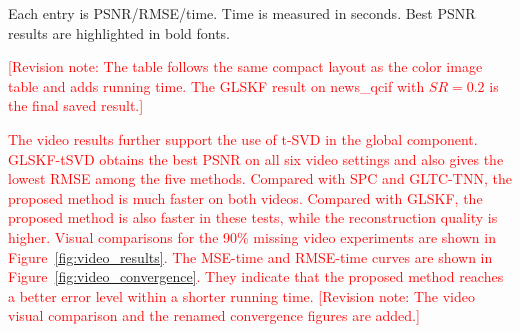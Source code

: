 \documentclass[a4paper,12pt]{article}
\numberwithin{equation}{section}
\numberwithin{algorithm}{section}
\newcommand{\rev}[1]{\textcolor{red}{#1}}
\newcommand{\revnote}[1]{\textcolor{red}{[Revision note: #1]}}
\theoremstyle{remark}
\theoremstyle{definition}
\begin{document}
\begin{table}[!htbp]
	\centering
	\color{red}
                                               	\caption{\textbf{Comparison of video completion (PSNR/RMSE/time).}}
	\label{tab:video_completion_all}
	\scriptsize
	\setlength{\tabcolsep}{2.2pt}
	\renewcommand{\arraystretch}{0.85}
	\begin{threeparttable}
		\begin{tablenotes}[flushleft]
			\footnotesize
			\item Each entry is PSNR/RMSE/time. Time is measured in seconds. Best PSNR results are highlighted in bold fonts.
			\item \revnote{The table follows the same compact layout as the color image table and adds running time. The GLSKF result on news\_qcif with $SR=0.2$ is the final saved result.}
		\end{tablenotes}
	\end{threeparttable}
\end{table}

\rev{The video results further support the use of t-SVD in the global component. GLSKF-tSVD obtains the best PSNR on all six video settings and also gives the lowest RMSE among the five methods. Compared with SPC and GLTC-TNN, the proposed method is much faster on both videos. Compared with GLSKF, the proposed method is also faster in these tests, while the reconstruction quality is higher. Visual comparisons for the 90\% missing video experiments are shown in Figure~\ref{fig:video_results}. The MSE-time and RMSE-time curves are shown in Figure~\ref{fig:video_convergence}. They indicate that the proposed method reaches a better error level within a shorter running time.} \revnote{The video visual comparison and the renamed convergence figures are added.}
\end{document}
